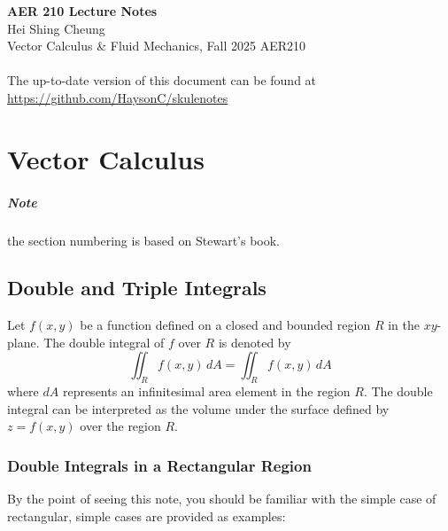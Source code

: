 \documentclass[11pt]{report}
\begin{document}
\thispagestyle{empty}
{\LARGE \bf AER 210 Lecture Notes}\\
{\large Hei Shing Cheung}\\
Vector Calculus \& Fluid Mechanics, Fall 2025 \hfill AER210\\
\\
The up-to-date version of this document can be found at \url{https://github.com/HaysonC/skulenotes}\\

\chapter{Vector Calculus}

\setcounter{section}{14}
\paragraph{Note} the section numbering is based on Stewart's book.
\section{Double and Triple Integrals}
\begin{definition}
    Let $f(x,y)$ be a function defined on a closed and bounded region $R$ in the $xy$-plane. The double integral of $f$ over $R$ is denoted by
    \begin{equation}
        \iint_R f(x,y) \, dA = \iint_R f(x,y) \, dA
    \end{equation}
    where $dA$ represents an infinitesimal area element in the region $R$. The double integral can be interpreted as the volume under the surface defined by $z = f(x,y)$ over the region $R$.
\end{definition}

\subsection{Double Integrals in a Rectangular Region}

 By the point of seeing this note, you should be familiar with the simple case of rectangular, simple cases are provided as examples:
\end{document}
